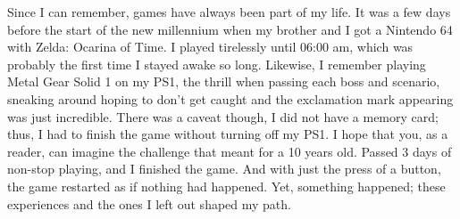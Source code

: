 
Since I can remember, games have always been part of my life. It was a few days before the start of the new millennium when my brother and I got a Nintendo 64 with Zelda: Ocarina of Time. I played tirelessly until 06:00 am, which was probably the first time I stayed awake so long. Likewise, I remember playing Metal Gear Solid 1 on my PS1, the thrill when passing each boss and scenario, sneaking around hoping to don't get caught and the exclamation mark appearing was just incredible. There was a caveat though, I did not have a memory card; thus, I had to finish the game without turning off my PS1. I hope that you, as a reader, can imagine the challenge that meant for a 10 years old. Passed 3 days of non-stop playing, and I finished the game. And with just the press of a button, the game restarted as if nothing had happened. Yet, something happened; these experiences and the ones I left out shaped my path. 

